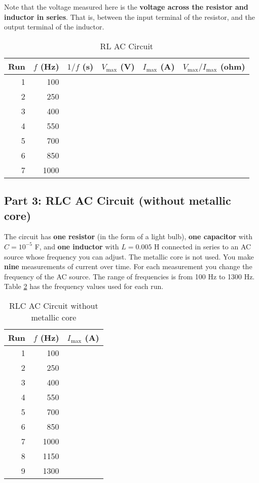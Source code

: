 Note that the voltage measured here is the \textbf{voltage across the resistor and inductor in series}. That is, between the input terminal of the resistor, and the output terminal of the inductor.
\begin{table}[ht!]
	\begin{center}
		\begin{tabular}{|r|r|r|r|r|r|}\hline
			Run & $f$ (Hz) & $1/f$ (s) & $V_{\text{max}}$ (V) & $I_{\text{max}}$ (A) & $V_{\text{max}}/I_{\text{max}}$ (ohm) \\
			\hline
			1 & 100 & & & & \\
			2 & 250 & & & & \\
			3 & 400 & & & & \\
			4 & 550 & & & & \\
			5 & 700 & & & & \\
			6 & 850 & & & & \\
			7 & 1000 & & & & \\
			\hline
		\end{tabular}
	\end{center}
	\caption{RL AC Circuit}
	\label{table.RL}
\end{table}
\subsection{Part 3: RLC AC Circuit (without metallic core)}
The circuit has \textbf{one resistor} (in the form of a light bulb), \textbf{one capacitor} with $C = 10^{-5}$ F, and \textbf{one inductor} with $L = 0.005$ H connected in series to an AC source whose frequency you can adjust. The metallic core is not used. You make \textbf{nine} measurements of current over time. For each measurement you change the frequency of the AC source. The range of frequencies is from 100 Hz to 1300 Hz. Table \ref{table.RLC} has the frequency values used for each run.
\begin{table}[ht!]
	\begin{center}
		\begin{tabular}{|r|r|r|}\hline
			Run & $f$ (Hz) & $I_{\text{max}}$ (A) \\
			\hline
			1 & 100 & \\
			2 & 250 & \\
			3 & 400 & \\
			4 & 550 & \\
			5 & 700 & \\
			6 & 850 & \\
			7 & 1000 & \\
			8 & 1150 & \\
			9 & 1300 & \\
			\hline
		\end{tabular}
	\end{center}
	\caption{RLC AC Circuit without metallic core}
	\label{table.RLC}
\end{table}
